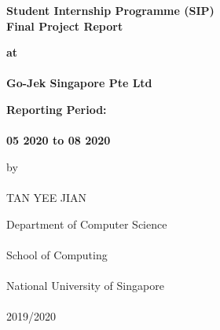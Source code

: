 \documentclass[a4paper, 12pt, fleqn]{report}
\begin{document}
\hypersetup{
linktoc=all     %
}

\begin{titlepage}
    \begin{center}
        \vspace*{1cm}

        \Large
        \textbf{Student Internship Programme (SIP) \\
        Final Project Report}

        \vspace{2cm}
        \large
        \textbf{at \\
        \ \\ Go-Jek Singapore Pte Ltd}
        
        \vspace{1cm}
        \normalsize
        \textbf{Reporting Period: \\
        \ \\ 05 2020 to 08 2020}

        \vspace{1cm}
        by \\
        \ \\ TAN YEE JIAN

        \vfill

        Department of Computer Science \\
        \ \\ School of Computing \\
        \ \\ National University of Singapore \\
        \ \\ 2019/2020
        \vspace{1cm}
    \end{center}
\end{titlepage}
\end{document}
